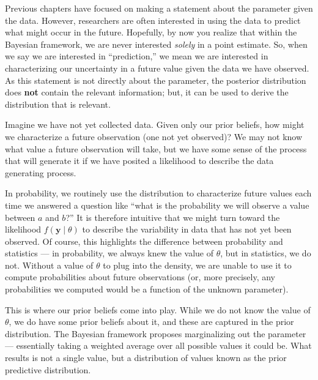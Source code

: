 \documentclass[
  letterpaper,
  DIV=11,
  numbers=noendperiod]{scrreprt}
\theoremstyle{definition}
\theoremstyle{plain}
\theoremstyle{definition}
\theoremstyle{remark}
\begin{document}
\providecommand{\norm}[1]{\lVert#1\rVert}
\providecommand{\abs}[1]{\lvert#1\rvert}
\providecommand{\iid}{\stackrel{\text{IID}}{\sim}}
\providecommand{\ind}{\stackrel{\text{Ind}}{\sim}}

\providecommand{\bm}[1]{\mathbf{#1}}
\providecommand{\bs}[1]{\boldsymbol{#1}}
\providecommand{\bbeta}{\bs{\beta}}

\providecommand{\Ell}{\mathcal{L}}
\providecommand{\indep}{\perp\negthickspace\negmedspace\perp}

Previous chapters have focused on making a statement about the parameter
given the data. However, researchers are often interested in using the
data to predict what might occur in the future. Hopefully, by now you
realize that within the Bayesian framework, we are never interested
\emph{solely} in a point estimate. So, when we say we are interested in
``prediction,'' we mean we are interested in characterizing our
uncertainty in a future value given the data we have observed. As this
statement is not directly about the parameter, the posterior
distribution does \textbf{not} contain the relevant information; but, it
can be used to derive the distribution that is relevant.

Imagine we have not yet collected data. Given only our prior beliefs,
how might we characterize a future observation (one not yet observed)?
We may not know what value a future observation will take, but we have
some sense of the process that will generate it if we have posited a
likelihood to describe the data generating process.

In probability, we routinely use the distribution to characterize future
values each time we answered a question like ``what is the probability
we will observe a value between \(a\) and \(b\)?'' It is therefore
intuitive that we might turn toward the likelihood
\(f(\mathbf{y} \mid \theta)\) to describe the variability in data that
has not yet been observed. Of course, this highlights the difference
between probability and statistics --- in probability, we always knew
the value of \(\theta\), but in statistics, we do not. Without a value
of \(\theta\) to plug into the density, we are unable to use it to
compute probabilities about future observations (or, more precisely, any
probabilities we computed would be a function of the unknown parameter).

This is where our prior beliefs come into play. While we do not know the
value of \(\theta\), we do have some prior beliefs about it, and these
are captured in the prior distribution. The Bayesian framework proposes
marginalizing out the parameter --- essentially taking a weighted
average over all possible values it could be. What results is not a
single value, but a distribution of values known as the prior predictive
distribution.
\end{document}
